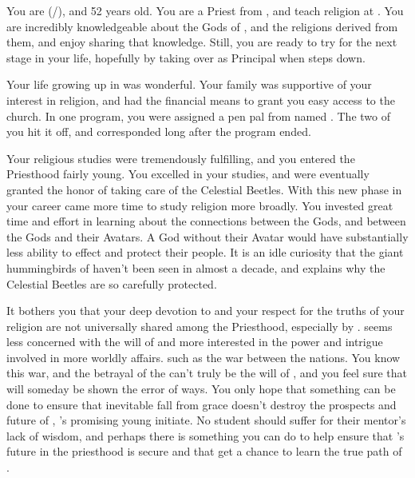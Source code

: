 \documentclass[char]{GL2020}
\begin{document}
\name{\cBeetle{}}

You are \cBeetle{} (\cBeetle{\they}/\cBeetle{\them}), and 52 years old. You are a Priest from \pTech{}, and teach religion at \pSchool{}. You are incredibly knowledgeable about the Gods of \pEarth{}, and the religions derived from them, and enjoy sharing that knowledge. Still, you are ready to try for the next stage in your life, hopefully by taking over as Principal when \cPrincipal{} steps down.

Your life growing up in \pTech{} was wonderful. Your family was supportive of your interest in religion, and had the financial means to grant you easy access to the church. In one program, you were assigned a pen pal from \pFarm{} named \cMusic{}. The two of you hit it off, and corresponded long after the program ended.

Your religious studies were tremendously fulfilling, and you entered the Priesthood fairly young. You excelled in your studies, and were eventually granted the honor of taking care of the Celestial Beetles. With this new phase in your career came more time to study religion more broadly. You invested great time and effort in learning about the connections between the Gods, and between the Gods and their Avatars. A God without their Avatar would have substantially less ability to effect \pEarth{} and protect their people. It is an idle curiosity that the giant hummingbirds of \cFarmGod{} haven’t been seen in almost a decade, and explains why the Celestial Beetles are so carefully protected.

It bothers you that your deep devotion to \cTechGod{} and your respect for the truths of your religion are not universally shared among the Priesthood, especially by \cAntiChup{}. \cAntiChup{} seems less concerned with the will of \cTechGod{} and more interested in the power and intrigue involved in more worldly affairs. such as the war between the nations.  You know this war, and the betrayal of the \pShippies{} can’t truly be the will of \cTechGod{}, and you feel sure that \cAntiChup{} will someday be shown the error of \cAntiChup{\their} ways. You only hope that something can be done to ensure that \cAntiChup{\their} inevitable fall from grace doesn’t destroy the prospects and future of \cScholarship{}, \cAntiChup{}'s promising young initiate. No student should suffer for their mentor’s lack of wisdom, and perhaps there is something you can do to help ensure that \cScholarship{}'s future in the priesthood is secure and that \cScholarship{\they} get a chance to learn the true path of \cTechGod{}.
\end{document}
